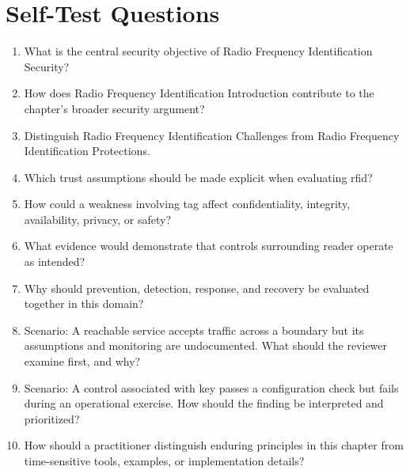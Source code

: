 \documentclass[11pt]{article}
\begin{document}
\section*{Self-Test Questions}
\begin{enumerate}
\item What is the central security objective of Radio Frequency Identification Security?
\item How does Radio Frequency Identification Introduction contribute to the chapter's broader security argument?
\item Distinguish Radio Frequency Identification Challenges from Radio Frequency Identification Protections.
\item Which trust assumptions should be made explicit when evaluating rfid?
\item How could a weakness involving tag affect confidentiality, integrity, availability, privacy, or safety?
\item What evidence would demonstrate that controls surrounding reader operate as intended?
\item Why should prevention, detection, response, and recovery be evaluated together in this domain?
\item Scenario: A reachable service accepts traffic across a boundary but its assumptions and monitoring are undocumented. What should the reviewer examine first, and why?
\item Scenario: A control associated with key passes a configuration check but fails during an operational exercise. How should the finding be interpreted and prioritized?
\item How should a practitioner distinguish enduring principles in this chapter from time-sensitive tools, examples, or implementation details?
\end{enumerate}
\end{document}
